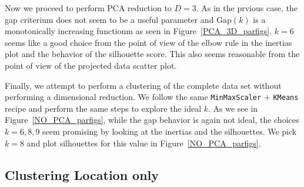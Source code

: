 \documentclass[12pt,a4paper]{article}
\begin{document}
Now we proceed to perform PCA reduction to $D=3$. As in the prvious case, the gap criterium does not seem to be a useful parameter and $\mathrm{Gap}(k)$ is a monotonically increasing functionm as seen in Figure~\ref{PCA_3D_parfigs}. $k=6$ seems like a good choice from the point of view of the elbow rule in the inertias plot and the behavior of the silhouette score. This also seems reasonable from the point of view of the projected data scatter plot.

Finally, we attempt to perform a clustering of the complete data set without performing a dimensional reduction. We follow the same \verb|MinMaxScaler| $+$ \verb|KMeans| recipe and perform the same steps to explore the ideal $k$. As we see in Figure~\ref{NO_PCA_parfigs}, while the gap behavior is again not ideal, the choices $k=6,8,9$ seem promising by looking at the inertias and the silhouettes. We pick $k=8$ and plot silhouettes for this value in Figure~\ref{NO_PCA_parfigs}.

\clearpage

\subsection{Clustering Location only}
\end{document}
